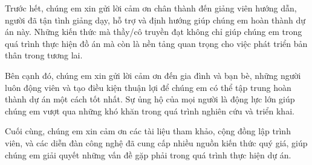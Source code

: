 
\vspace{0.5cm} %

Trước hết, chúng em xin gửi lời cảm ơn chân thành đến giảng viên hướng dẫn, người đã tận tình giảng dạy, hỗ trợ và định hướng giúp chúng em hoàn thành dự án này. Những kiến thức mà thầy/cô truyền đạt không chỉ giúp chúng em trong quá trình thực hiện đồ án mà còn là nền tảng quan trọng cho việc phát triển bản thân trong tương lai.

Bên cạnh đó, chúng em xin gửi lời cảm ơn đến gia đình và bạn bè, những người luôn động viên và tạo điều kiện thuận lợi để chúng em có thể tập trung hoàn thành dự án một cách tốt nhất. Sự ủng hộ của mọi người là động lực lớn giúp chúng em vượt qua những khó khăn trong quá trình nghiên cứu và triển khai.

Cuối cùng, chúng em xin cảm ơn các tài liệu tham khảo, cộng đồng lập trình viên, và các diễn đàn công nghệ đã cung cấp nhiều nguồn kiến thức quý giá, giúp chúng em giải quyết những vấn đề gặp phải trong quá trình thực hiện dự án.\\ \\